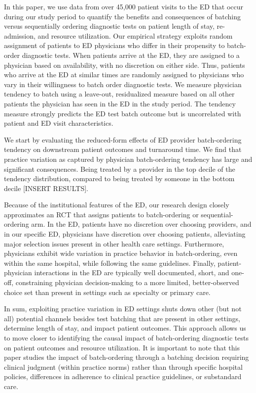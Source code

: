 \documentclass[,,nonblindrev]{informs}
\begin{document}
In this paper, we use data from over 45,000 patient visits to the ED
that occur during our study period to quantify the benefits and
consequences of batching versus sequentially ordering diagnostic tests
on patient length of stay, re-admission, and resource utilization. Our
empirical strategy exploits random assignment of patients to ED
physicians who differ in their propensity to batch-order diagnostic
tests. When patients arrive at the ED, they are assigned to a physician
based on availability, with no discretion on either side. Thus, patients
who arrive at the ED at similar times are randomly assigned to
physicians who vary in their willingness to batch order diagnostic
tests. We measure physician tendency to batch using a leave-out,
residualized measure based on all other patients the physician has seen
in the ED in the study period. The tendency measure strongly predicts
the ED test batch outcome but is uncorrelated with patient and ED visit
characteristics.

We start by evaluating the reduced-form effects of ED provider
batch-ordering tendency on downstream patient outcomes and turnaround
time. We find that practice variation as captured by physician
batch-ordering tendency has large and significant consequences. Being
treated by a provider in the top decile of the tendency distribution,
compared to being treated by someone in the bottom decile {[}INSERT
RESULTS{]}.

Because of the institutional features of the ED, our research design
closely approximates an RCT that assigns patients to batch-ordering or
sequential-ordering arm. In the ED, patients have no discretion over
choosing providers, and in our specific ED, physicians have discretion
over choosing patients, alleviating major selection issues present in
other health care settings. Furthermore, physicians exhibit wide
variation in practice behavior in batch-ordering, even within the same
hospital, while following the same guidelines. Finally,
patient-physician interactions in the ED are typically well documented,
short, and one-off, constraining physician decision-making to a more
limited, better-observed choice set than present in settings such as
specialty or primary care.

In sum, exploiting practice variation in ED settings shuts down other
(but not all) potential channels besides test batching that are present
in other settings, determine length of stay, and impact patient
outcomes. This approach allows us to move closer to identifying the
causal impact of batch-ordering diagnostic tests on patient outcomes and
resource utilization. It is important to note that this paper studies
the impact of batch-ordering through a batching decision requiring
clinical judgment (within practice norms) rather than through specific
hospital policies, differences in adherence to clinical practice
guidelines, or substandard care.
\end{document}
